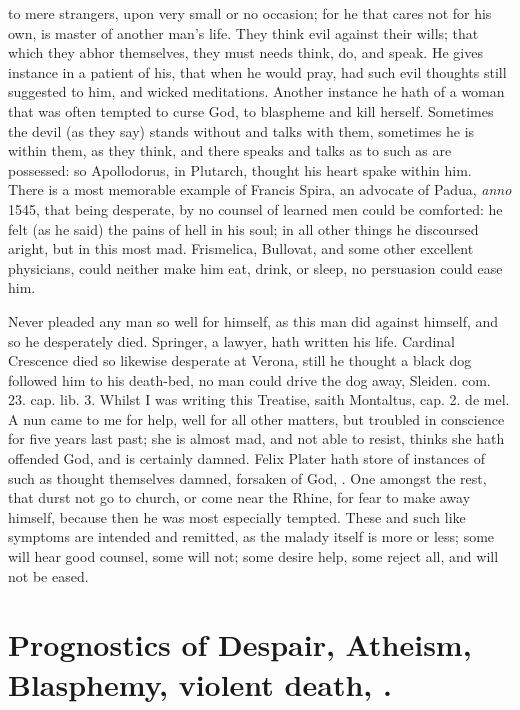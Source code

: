 {to mere strangers, upon very small or no occasion; for he that cares
not for his own, is master of another man's life. They think evil
against their wills; that which they abhor themselves, they must needs
think, do, and speak. He gives instance in a patient of his, that when
he would pray, had such evil thoughts still suggested to him, and
wicked meditations. Another instance he hath of a woman that was
often tempted to curse God, to blaspheme and kill herself. Sometimes
the devil (as they say) stands without and talks with them, sometimes
he is within them, as they think, and there speaks and talks as to such
as are possessed: so Apollodorus, in Plutarch, thought his heart spake
within him. There is a most memorable example of Francis Spira,
an advocate of Padua, \emph{anno} 1545, that being desperate, by no counsel of
learned men could be comforted: he felt (as he said) the pains of hell
in his soul; in all other things he discoursed aright, but in this most
mad. Frismelica, Bullovat, and some other excellent physicians, could
neither make him eat, drink, or sleep, no persuasion could ease him.

Never pleaded any man so well for himself, as this man did against
himself, and so he desperately died. Springer, a lawyer, hath written
his life. Cardinal Crescence died so likewise desperate at Verona,
still he thought a black dog followed him to his death-bed, no man
could drive the dog away, Sleiden. \textlatin{com. 23. cap. lib. 3.} Whilst I was
writing this Treatise, saith Montaltus, \textlatin{cap. 2. de mel.} A nun
came to me for help, well for all other matters, but troubled in
conscience for five years last past; she is almost mad, and not able to
resist, thinks she hath offended God, and is certainly damned. Felix
Plater hath store of instances of such as thought themselves damned,
 forsaken of God, \etc{}. One amongst the rest, that durst not go to
church, or come near the Rhine, for fear to make away himself, because
then he was most especially tempted. These and such like symptoms are
intended and remitted, as the malady itself is more or less; some will
hear good counsel, some will not; some desire help, some reject all,
and will not be eased.

\section[Prognostics of Despair]{Prognostics of Despair, Atheism, Blasphemy, violent death, \etc{}.}

}

